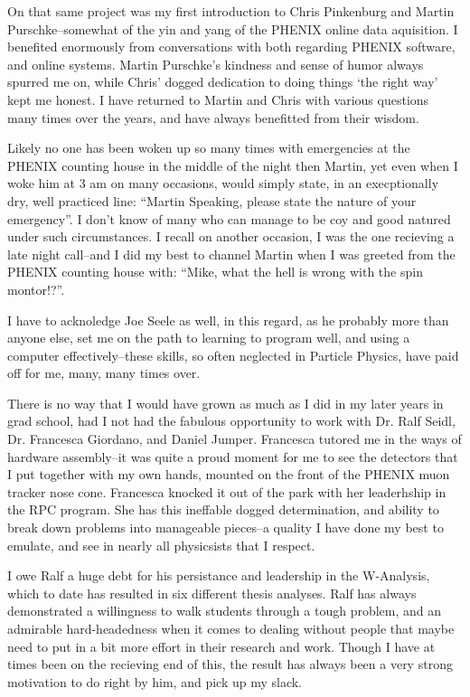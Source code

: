 On that same project was my first introduction to Chris Pinkenburg and Martin
Purschke--somewhat of the yin and yang of the PHENIX online data aquisition. I
benefited enormously from conversations with both regarding PHENIX software,
and online systems. Martin Purschke's kindness and sense of humor always
spurred me on, while Chris' dogged dedication to doing things `the right way'
kept me honest. I have returned to Martin and Chris with various questions many
times over the years, and have always benefitted from their wisdom.

Likely no one has been woken up so many times with emergencies at the PHENIX
counting house in the middle of the night then Martin, yet even when I woke him
at 3 am on many occasions, would simply state, in an execptionally dry, well
practiced line: ``Martin Speaking, please state the nature of your emergency''. I
don't know of many who can manage to be coy and good natured under such
circumstances. I recall on another occasion, I was the one recieving a late
night call--and I did my best to channel Martin when I was greeted from the
PHENIX counting house with: ``Mike, what the hell is wrong with the spin
montor!?''.

I have to acknoledge Joe Seele as well, in this regard, as he probably more
than anyone else, set me on the path to learning to program well, and using a
computer effectively--these skills, so often neglected in Particle Physics,
have paid off for me, many, many times over.

There is no way that I would have grown as much as I did in my later years in
grad school, had I not had the fabulous opportunity to work with Dr. Ralf
Seidl, Dr. Francesca Giordano, and Daniel Jumper. Francesca tutored me in the
ways of hardware assembly--it was quite a proud moment for me to see the
detectors that I put together with my own hands, mounted on the front of the
PHENIX muon tracker nose cone. Francesca knocked it out of the park with her
leaderhship in the RPC program. She has this ineffable dogged determination,
and ability to break down problems into manageable pieces--a quality I have
done my best to emulate, and see in nearly all physicsists that I respect.

I owe Ralf a huge debt for his persistance and leadership in the W-Analysis,
which to date has resulted in six different thesis analyses. Ralf has always
demonstrated a willingness to walk students through a tough problem, and an
admirable hard-headedness when it comes to dealing without people that maybe
need to put in a bit more effort in their research and work. Though I have at
times been on the recieving end of this, the result has always been a very
strong motivation to do right by him, and pick up my slack.

